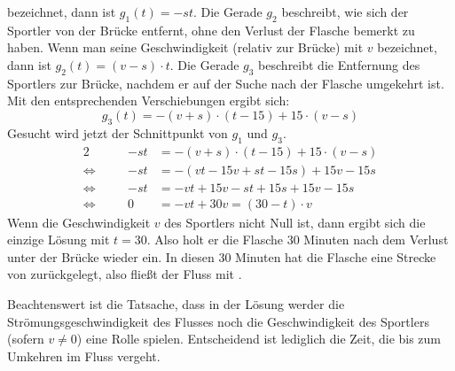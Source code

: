\begin{exercise}
    bezeichnet, dann ist $g_{1}(t)=-st$. Die Gerade $g_{2}$ beschreibt,
    wie sich der Sportler von der Brücke entfernt, ohne den Verlust der
    Flasche bemerkt zu haben. Wenn man seine Geschwindigkeit (relativ
    zur Brücke) mit $v$ bezeichnet, dann ist $g_{2}(t)=(v-s)\cdot t$.
    Die Gerade $g_{3}$ beschreibt die Entfernung des Sportlers zur Brücke,
    nachdem er auf der Suche nach der Flasche umgekehrt ist. Mit den
    entsprechenden Verschiebungen ergibt sich:
    \begin{equation*}
      g_{3}(t)=-(v+s)\cdot(t-15)+15\cdot(v-s)
    \end{equation*}
    Gesucht wird jetzt der Schnittpunkt von $g_{1}$ und $g_{3}$.
    \newcommand{\aq}{\Leftrightarrow}%
    \begin{alignat*}{2}
         &\quad & -st&=-(v+s)\cdot(t-15)+15\cdot(v-s) \\
      \aq&\quad & -st&=-(vt-15v+st-15s)+15v-15s \\
      \aq&\quad & -st&=-vt+15v-st+15s+15v-15s \\
      \aq&\quad &   0&=-vt+30v=(30-t)\cdot v
    \end{alignat*}
    Wenn die Geschwindigkeit $v$ des Sportlers nicht Null ist,
    dann ergibt sich die einzige Lösung mit $t=30$. Also holt
    er die Flasche 30 Minuten nach dem Verlust unter der Brücke
    wieder ein.
    In diesen 30 Minuten hat die Flasche eine Strecke von 
    zurückgelegt, also fließt der Fluss mit .\par
    Beachtenswert ist die Tatsache, dass in der Lösung werder die Strömungsgeschwindigkeit
    des Flusses noch die Geschwindigkeit des Sportlers (sofern $v\neq0$) eine Rolle spielen.
    Entscheidend ist lediglich die Zeit, die bis zum Umkehren im Fluss vergeht.
  \fi
\end{exercise}
